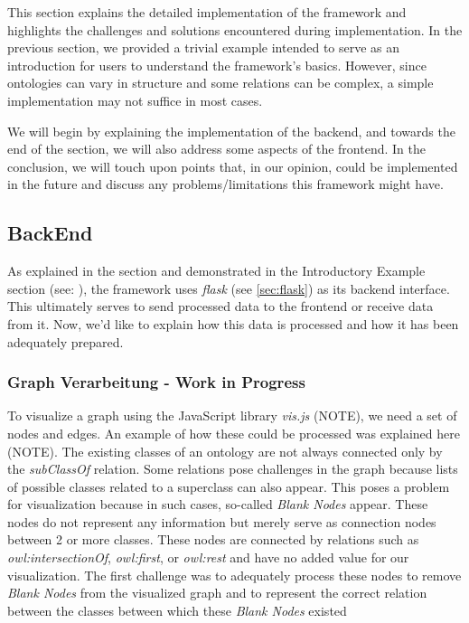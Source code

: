 This section explains the detailed implementation of the framework and highlights the challenges and solutions encountered during implementation. In the previous section, we provided a trivial example intended to serve as an introduction for users to understand the framework's basics. However, since ontologies can vary in structure and some relations can be complex, a simple implementation may not suffice in most cases.

We will begin by explaining the implementation of the backend, and towards the end of the section, we will also address some aspects of the frontend. In the conclusion, we will touch upon points that, in our opinion, could be implemented in the future and discuss any problems/limitations this framework might have.
\subsection{BackEnd}

As explained in the  section and demonstrated in the Introductory Example section (see: ), the framework uses \textit{flask} (see \ref{sec:flask}) as its backend interface. 
This ultimately serves to send processed data to the frontend or receive data from it. Now, we'd like to explain how this data is processed and how it has been adequately prepared.
\subsubsection{Graph Verarbeitung - Work in Progress}

To visualize a graph using the JavaScript library \textit{vis.js} (NOTE), we need a set of nodes and edges. An example of how these could be processed was explained here (NOTE). The existing classes of an ontology are not always connected only by the \textit{subClassOf} relation. Some relations pose challenges in the graph because lists of possible classes related to a superclass can also appear. This poses a problem for visualization because in such cases, so-called \textit{Blank Nodes} appear. These nodes do not represent any information but merely serve as connection nodes between 2 or more classes. These nodes are connected by relations such as \textit{owl:intersectionOf}, \textit{owl:first}, or \textit{owl:rest} and have no added value for our visualization. The first challenge was to adequately process these nodes to remove \textit{Blank Nodes} from the visualized graph and to represent the correct relation between the classes between which these \textit{Blank Nodes} existed

